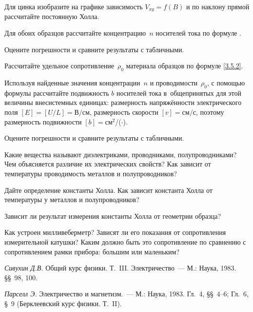 \begin{lab:task}
{Для цинка изобразите на графике зависимость $V_{xy}=f(B)$ и по наклону прямой
рассчитайте постоянную Холла.

Для обоих образцов рассчитайте концентрацию~$n$ носителей тока по формуле
.

Оцените погрешности и сравните результаты с табличными.}

\item{ Рассчитайте удельное сопротивление~$\rho_0$ материала образцов по формуле
\eqref{3.5.2}.

Используя найденные значения концентрации~$n$ и проводимости~$\rho_0$, с помощью
формулы  рассчитайте подвижность $b$ носителей тока
в~общепринятых для этой величины внесистемных единицах: размерность
напряжённости электрического поля $[E] = [U/L]=\text{В/см}$, размерность
скорости $[v]=\text{см/с}$, поэтому размерность подвижности
$[b]=$см$^2$/($\cdot$).

Оцените погрешности и сравните результаты с табличными.
}

\end{lab:task}


\begin{lab:questions}

\item{ Какие вещества называют диэлектриками, проводниками, полупроводниками?
Чем объясняется различие их электрических свойств? Как зависит от температуры
проводимость металлов и полупроводников?}

\item{ Дайте определение константы Холла. Как зависит константа Холла от
температуры у металлов и полупроводников?}

\item{ Зависит ли результат измерения константы Холла от геометрии образца?}

\item{ Как устроен милливеберметр? Зависят ли его показания от сопротивления
измерительной катушки? Каким должно быть это сопротивление по сравнению с
сопротивлением рамки прибора: большим или маленьким?}

\end{lab:questions}

\begin{lab:literature}

\item{ \emph{Сивухин Д.В.} Общий курс физики. Т.~III. Электричество~--- М.:
Наука, 1983. \S\S~98, 100.}

\item{ \emph{Парселл Э.} Электричество и магнетизм.~--- М.: Наука, 1983. Гл.~4,
\S\S~4--6; Гл.~6, \S~9 (Берклеевский курс физики. Т.~II).}
\end{lab:literature}
